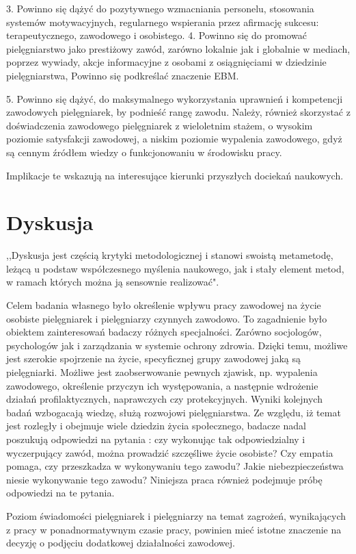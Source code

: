 \documentclass[a4paper,12pt,twoside,openright]{mwrep}
\begin{document}
3.	Powinno się dążyć do pozytywnego wzmacniania personelu, stosowania systemów motywacyjnych, regularnego wspierania przez afirmację sukcesu: terapeutycznego, zawodowego i osobistego.
4.	Powinno się do promować pielęgniarstwo jako prestiżowy zawód, zarówno lokalnie jak i globalnie w mediach, poprzez wywiady, akcje informacyjne z osobami z osiągnięciami w dziedzinie pielęgniarstwa, Powinno się podkreślać znaczenie EBM.

5.	Powinno się dążyć, do maksymalnego wykorzystania uprawnień i kompetencji zawodowych pielęgniarek, by podnieść rangę zawodu. Należy, również skorzystać z doświadczenia zawodowego pielęgniarek z wieloletnim stażem, o wysokim poziomie satysfakcji zawodowej, a niskim poziomie wypalenia zawodowego, gdyż są cennym źródłem wiedzy o funkcjonowaniu w środowisku pracy.


Implikacje te wskazują na interesujące kierunki przyszłych dociekań naukowych.


\section*{Dyskusja}
,,Dyskusja jest częścią krytyki metodologicznej i stanowi swoistą metametodę, leżącą u podstaw współczesnego myślenia naukowego, jak i stały element metod, w ramach których można ją sensownie realizować"\cite{krytyka}.


Celem badania własnego było określenie wpływu pracy zawodowej na życie osobiste pielęgniarek i pielęgniarzy czynnych zawodowo. To zagadnienie było obiektem zainteresowań badaczy różnych specjalności. Zarówno socjologów, psychologów jak i zarządzania w systemie ochrony zdrowia.  Dzięki temu, możliwe jest szerokie spojrzenie na życie, specyficznej grupy zawodowej jaką są pielęgniarki. Możliwe jest zaobserwowanie pewnych zjawisk, np. wypalenia zawodowego, określenie przyczyn ich występowania, a następnie wdrożenie działań profilaktycznych, naprawczych czy protekcyjnych. Wyniki kolejnych badań wzbogacają wiedzę, służą rozwojowi pielęgniarstwa. Ze względu, iż temat jest rozległy i obejmuje wiele dziedzin życia społecznego, badacze nadal poszukują odpowiedzi na pytania : czy wykonując tak odpowiedzialny i wyczerpujący zawód, można prowadzić szczęśliwe życie osobiste? Czy empatia pomaga, czy przeszkadza w wykonywaniu tego zawodu? Jakie niebezpieczeństwa niesie wykonywanie tego zawodu? Niniejsza praca również podejmuje próbę odpowiedzi na te pytania.

Poziom świadomości pielęgniarek i pielęgniarzy na temat zagrożeń, wynikających z pracy w ponadnormatywnym czasie pracy, powinien mieć istotne znaczenie na decyzję o podjęciu dodatkowej działalności zawodowej. 
\end{document}
